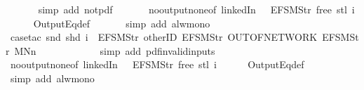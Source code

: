 \begin{isabellebody}
\isanewline
\ \ \ \ \ \isamarkupfalse%
\ {\isacharparenleft}simp\ add{\isacharcolon}\ not{\isacharunderscore}pdf{\isacharunderscore}{}\ {\isacharparenright}\isanewline
\ \ \ \ \isamarkupfalse%
\ no{\isacharunderscore}output{\isacharunderscore}none{\isacharbrackleft}of\ linkedIn\ {\isachardoublequoteopen}{\isacharless}{}\ {\isacharcolon}{\isacharequal}\ EFSM{\isachardot}Str\ {\isacharprime}{\isacharprime}free{\isacharprime}{\isacharprime}{\isachargreater}{\isachardoublequoteclose}\ {\isachardoublequoteopen}{\isacharparenleft}stl\ i{\isacharparenright}{\isachardoublequoteclose}{\isacharbrackright}\isanewline
\ \ \ \ \isamarkupfalse%
\ OutputEq{\isacharunderscore}def\isanewline
\ \ \ \ \ \isamarkupfalse%
\ {\isacharparenleft}simp\ add{\isacharcolon}\ alw{\isacharunderscore}mono{\isacharparenright}\isanewline
\ \ \ \ \isamarkupfalse%
\ {\isacharparenleft}case{\isacharunderscore}tac\ {\isachardoublequoteopen}{\isacharparenleft}snd\ {\isacharparenleft}shd\ i{\isacharparenright}{\isacharparenright}\ {\isacharequal}\ {\isacharbrackleft}EFSM{\isachardot}Str\ {\isacharprime}{\isacharprime}otherID{\isacharprime}{\isacharprime}{\isacharcomma}\ EFSM{\isachardot}Str\ {\isacharprime}{\isacharprime}OUT{\isacharunderscore}OF{\isacharunderscore}NETWORK{\isacharprime}{\isacharprime}{\isacharcomma}\ EFSM{\isachardot}Str\ {\isacharprime}{\isacharprime}MNn{}{\isacharprime}{\isacharprime}{\isacharbrackright}{\isachardoublequoteclose}{\isacharparenright}\isanewline
\ \ \ \ \ \isamarkupfalse%
\isanewline
\ \ \ \ \ \isamarkupfalse%
\ {\isacharparenleft}simp\ add{\isacharcolon}\ pdf{\isacharunderscore}{}{\isacharunderscore}invalid{\isacharunderscore}inputs{\isacharparenright}\isanewline
\ \ \ \ \isamarkupfalse%
\ no{\isacharunderscore}output{\isacharunderscore}none{\isacharbrackleft}of\ linkedIn\ {\isachardoublequoteopen}{\isacharless}{}\ {\isacharcolon}{\isacharequal}\ EFSM{\isachardot}Str\ {\isacharprime}{\isacharprime}free{\isacharprime}{\isacharprime}{\isachargreater}{\isachardoublequoteclose}\ {\isachardoublequoteopen}{\isacharparenleft}stl\ i{\isacharparenright}{\isachardoublequoteclose}{\isacharbrackright}\isanewline
\ \ \ \ \isamarkupfalse%
\ OutputEq{\isacharunderscore}def\isanewline
\ \ \ \ \ \isamarkupfalse%
\ {\isacharparenleft}simp\ add{\isacharcolon}\ alw{\isacharunderscore}mono{\isacharparenright}\isanewline
\ \ \ \ \ \isamarkupfalse%

\end{isabellebody}
